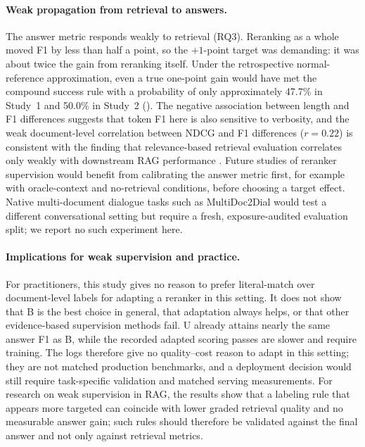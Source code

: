 \paragraph{Weak propagation from retrieval to answers.} The answer metric responds weakly to retrieval (RQ3). Reranking as a whole moved F1 by less than half a point, so the $+1$-point target was demanding: it was about twice the gain from reranking itself. Under the retrospective normal-reference approximation, even a true one-point gain would have met the compound success rule with a probability of only approximately 47.7\% in Study~1 and 50.0\% in Study~2 (). The negative association between length and F1 differences suggests that token F1 here is also sensitive to verbosity, and the weak document-level correlation between NDCG and F1 differences ($r=0.22$) is consistent with the finding that relevance-based retrieval evaluation correlates only weakly with downstream RAG performance \citep{salemi2024}. Future studies of reranker supervision would benefit from calibrating the answer metric first, for example with oracle-context and no-retrieval conditions, before choosing a target effect. Native multi-document dialogue tasks such as MultiDoc2Dial \citep{feng2021multi} would test a different conversational setting but require a fresh, exposure-audited evaluation split; we report no such experiment here.

\paragraph{Implications for weak supervision and practice.} For practitioners, this study gives no reason to prefer literal-match over document-level labels for adapting a reranker in this setting. It does not show that B is the best choice in general, that adaptation always helps, or that other evidence-based supervision methods fail. U already attains nearly the same answer F1 as B, while the recorded adapted scoring passes are slower and require training. The logs therefore give no quality--cost reason to adapt in this setting; they are not matched production benchmarks, and a deployment decision would still require task-specific validation and matched serving measurements. For research on weak supervision in RAG, the results show that a labeling rule that appears more targeted can coincide with lower graded retrieval quality and no measurable answer gain; such rules should therefore be validated against the final answer and not only against retrieval metrics.

